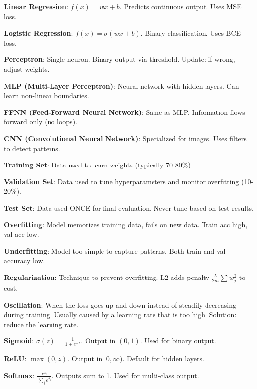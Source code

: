 \documentclass[11pt,a4paper]{article}
\begin{document}
\begin{definitionbox}

\textbf{Linear Regression}: $f(x) = wx + b$. Predicts continuous output. Uses MSE loss.

\textbf{Logistic Regression}: $f(x) = \sigma(wx + b)$. Binary classification. Uses BCE loss.

\textbf{Perceptron}: Single neuron. Binary output via threshold. Update: if wrong, adjust weights.

\textbf{MLP (Multi-Layer Perceptron)}: Neural network with hidden layers. Can learn non-linear boundaries.

\textbf{FFNN (Feed-Forward Neural Network)}: Same as MLP. Information flows forward only (no loops).

\textbf{CNN (Convolutional Neural Network)}: Specialized for images. Uses filters to detect patterns.
\end{definitionbox}

\begin{definitionbox}

\textbf{Training Set}: Data used to learn weights (typically 70-80\%).

\textbf{Validation Set}: Data used to tune hyperparameters and monitor overfitting (10-20\%).

\textbf{Test Set}: Data used ONCE for final evaluation. Never tune based on test results.

\textbf{Overfitting}: Model memorizes training data, fails on new data. Train acc high, val acc low.

\textbf{Underfitting}: Model too simple to capture patterns. Both train and val accuracy low.

\textbf{Regularization}: Technique to prevent overfitting. L2 adds penalty $\frac{\lambda}{2m}\sum w_j^2$ to cost.

\textbf{Oscillation}: When the loss goes up and down instead of steadily decreasing during training. Usually caused by a learning rate that is too high. Solution: reduce the learning rate.
\end{definitionbox}

\begin{definitionbox}

\textbf{Sigmoid}: $\sigma(z) = \frac{1}{1+e^{-z}}$. Output in $(0,1)$. Used for binary output.

\textbf{ReLU}: $\max(0, z)$. Output in $[0, \infty)$. Default for hidden layers.

\textbf{Softmax}: $\frac{e^{z_i}}{\sum_j e^{z_j}}$. Outputs sum to 1. Used for multi-class output.
\end{definitionbox}
\end{document}

